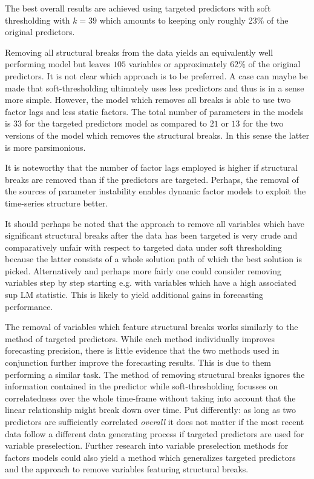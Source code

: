 \documentclass[12pt]{article}
\begin{document}
The best overall results are achieved using targeted predictors with soft thresholding with $k=39$ which amounts to keeping only roughly 23\% of the original predictors. 

Removing all structural breaks from the data yields an equivalently well performing model but leaves $105$ variables or approximately 62\% of the original predictors. It is not clear which approach is to be preferred. A case can maybe be made that soft-thresholding ultimately uses less predictors and thus is in a sense more simple. However, the model which removes all breaks is able to use two factor lags and less static factors. The total number of parameters in the models is $33$ for the targeted predictors model as compared to $21$ or $13$ for the two versions of the model which removes the structural breaks. In this sense the latter is more parsimonious.

It is noteworthy that the number of factor lags employed is higher if structural breaks are removed than if the predictors are targeted. Perhaps, the removal of the sources of parameter instability enables dynamic factor models to exploit the time-series structure better.

It should perhaps be noted that the approach to remove all variables which have significant structural breaks after the data has been targeted is very crude and comparatively unfair with respect to targeted data under soft thresholding because the latter consists of a whole solution path of which the best solution is picked. Alternatively and perhaps more fairly one could consider removing variables step by step starting e.g. with variables which have a high associated sup LM statistic. This is likely to yield additional gains in forecasting performance.

The removal of variables which feature structural breaks works similarly to the method of targeted predictors. While each method individually improves forecasting precision, there is little evidence that the two methods used in conjunction further improve the forecasting results. This is due to them performing a similar task. The method of removing structural breaks ignores the information contained in the predictor while soft-thresholding focusses on correlatedness over the whole time-frame without taking into account that the linear relationship might break down over time. Put differently: as long as two predictors are sufficiently correlated \textit{overall} it does not matter if the most recent data follow a different data generating process if targeted predictors are used for variable preselection. Further research into variable preselection methods for factors models could also yield a method which generalizes targeted predictors and the approach to remove variables featuring structural breaks.
\end{document}
